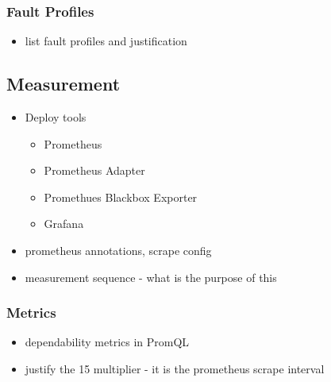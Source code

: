 \subsubsection{Fault Profiles}

\begin{itemize}
	\item list fault profiles and justification
\end{itemize}

\subsection{Measurement} \label{measurement-impl}

\begin{itemize}
	\item Deploy tools \begin{itemize}
		\item Prometheus
		\item Prometheus Adapter
		\item Promethues Blackbox Exporter
		\item Grafana
	\end{itemize}
	\item prometheus annotations, scrape config
	\item measurement sequence - what is the purpose of this
\end{itemize}

\subsubsection{Metrics}

\begin{itemize}
	
	\item dependability metrics in PromQL
	\item justify the 15 multiplier - it is the prometheus scrape interval
\end{itemize}







